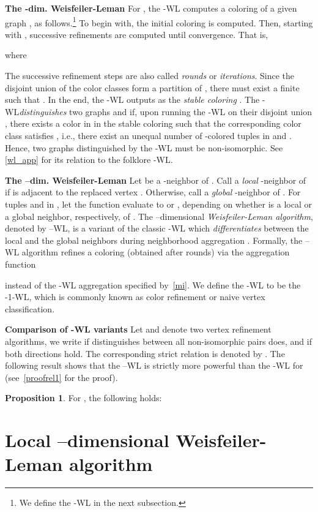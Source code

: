 \documentclass{article}
\newcommand{\xhdr}[1]{{\noindent\bfseries #1}}
\theoremstyle{definition}
\newtheorem{proposition}[theorem]{Proposition}
\newcommand{\new}[1]{\emph{#1}}
\newcommand{\kwl}{-\textsf{WL}\xspace}
\newcommand{\deltakwl}{--\textsf{WL}\xspace}
\begin{document}
\xhdr{The -dim. Weisfeiler-Leman} For , the \kwl computes a coloring  of a given graph , as follows.\footnote{We define the -\textsf{WL} in the next subsection.} To begin with, the initial coloring  is computed. Then, starting with , successive refinements  are computed until convergence. That is,

where 

The successive refinement steps are also called \new{rounds} or \new{iterations}. Since the disjoint union of the color classes form a partition of , there must exist a finite  such that . In the end, the \kwl outputs  as the \emph{stable coloring} . The \kwl \new{distinguishes} two graphs  and  if, upon running the \kwl on their disjoint union , there exists a color  in  in the stable coloring such that the corresponding color class  satisfies
, i.e., there exist an unequal number of -colored tuples in  and . Hence, two graphs distinguished by the \kwl must be non-isomorphic. See \cref{wl_app} for its relation to the folklore \kwl.

\xhdr{The --dim. Weisfeiler-Leman} Let  be a -{neighbor} of . Call  a \new{local} -neighbor of  if  is adjacent to the replaced vertex . Otherwise, call  a \new{global} -neighbor of . For tuples  and  in , let the function  evaluate to  or , depending on whether  is a local or a global neighbor, respectively, of . The --dimensional \new{Weisfeiler-Leman algorithm}, denoted by \deltakwl, is a variant of the classic \kwl which \emph{differentiates} between the local and the global neighbors during neighborhood aggregation \cite{Mal2014}. Formally, the \deltakwl algorithm refines a coloring  (obtained after  rounds) via the aggregation function 

instead of the \kwl aggregation specified by~\cref{mi}. We define the -\textsf{WL} to be the -1-\textsf{WL}, which is commonly known as color refinement or naive vertex classification.

\xhdr{Comparison of -\textsf{WL} variants} Let  and  denote two vertex refinement algorithms, we write  if  distinguishes between all non-isomorphic pairs  does, and  if both directions hold. The corresponding strict relation is denoted by . The following result shows that the \deltakwl is strictly more powerful than the \kwl for  (see~\cref{proofrel1} for the proof).  
\begin{proposition}\label{rel1} 
For , the following holds: 	

\end{proposition}
\section{Local --dimensional Weisfeiler-Leman algorithm}\label{lwl}
\end{document}
